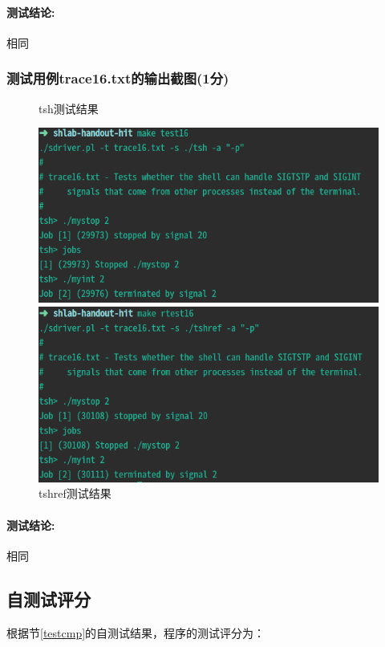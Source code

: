 \paragraph{测试结论:}相同

\subsubsection{测试用例trace16.txt的输出截图(1分)}\label{testend}

\begin{figure}[H]
    \begin{minipage}[c]{0.5\linewidth}
        \centering
        \caption{tsh测试结果}
        \includegraphics[width=0.7\linewidth]{figures/test16.png}
    \end{minipage}
    \begin{minipage}[c]{0.5\linewidth}
        \centering
        \caption{tshref测试结果}
        \includegraphics[width=0.7\linewidth]{figures/rtest16.png}
    \end{minipage}
\end{figure}

\paragraph{测试结论:}相同

\subsection{自测试评分}

根据节\ref{testcmp}的自测试结果，程序的测试评分为：